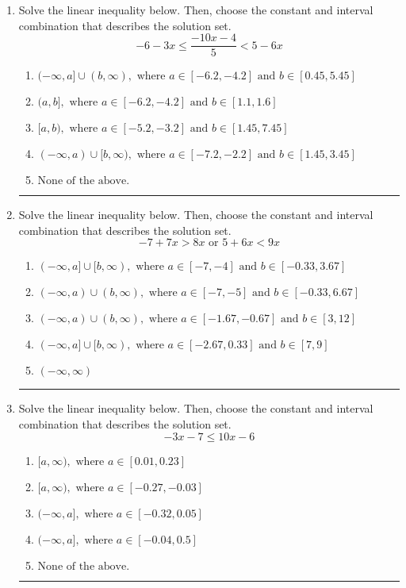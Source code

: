 \documentclass[14pt]{extbook}
\newcommand{\litem}[1]{\item#1\hspace*{-1cm}\rule{\textwidth}{0.4pt}}
\begin{document}
\begin{enumerate}
{\begin{enumerate}[label=\Alph*.]
\end{enumerate} }
\litem{
Solve the linear inequality below. Then, choose the constant and interval combination that describes the solution set.\[ -6 - 3 x \leq \frac{-10 x - 4}{5} < 5 - 6 x \]\begin{enumerate}[label=\Alph*.]
\item \( (-\infty, a] \cup (b, \infty), \text{ where } a \in [-6.2, -4.2] \text{ and } b \in [0.45, 5.45] \)
\item \( (a, b], \text{ where } a \in [-6.2, -4.2] \text{ and } b \in [1.1, 1.6] \)
\item \( [a, b), \text{ where } a \in [-5.2, -3.2] \text{ and } b \in [1.45, 7.45] \)
\item \( (-\infty, a) \cup [b, \infty), \text{ where } a \in [-7.2, -2.2] \text{ and } b \in [1.45, 3.45] \)
\item \( \text{None of the above.} \)

\end{enumerate} }
\litem{
Solve the linear inequality below. Then, choose the constant and interval combination that describes the solution set.\[ -7 + 7 x > 8 x \text{ or } 5 + 6 x < 9 x \]\begin{enumerate}[label=\Alph*.]
\item \( (-\infty, a] \cup [b, \infty), \text{ where } a \in [-7, -4] \text{ and } b \in [-0.33, 3.67] \)
\item \( (-\infty, a) \cup (b, \infty), \text{ where } a \in [-7, -5] \text{ and } b \in [-0.33, 6.67] \)
\item \( (-\infty, a) \cup (b, \infty), \text{ where } a \in [-1.67, -0.67] \text{ and } b \in [3, 12] \)
\item \( (-\infty, a] \cup [b, \infty), \text{ where } a \in [-2.67, 0.33] \text{ and } b \in [7, 9] \)
\item \( (-\infty, \infty) \)

\end{enumerate} }
\litem{
Solve the linear inequality below. Then, choose the constant and interval combination that describes the solution set.\[ -3x -7 \leq 10x -6 \]\begin{enumerate}[label=\Alph*.]
\item \( [a, \infty), \text{ where } a \in [0.01, 0.23] \)
\item \( [a, \infty), \text{ where } a \in [-0.27, -0.03] \)
\item \( (-\infty, a], \text{ where } a \in [-0.32, 0.05] \)
\item \( (-\infty, a], \text{ where } a \in [-0.04, 0.5] \)
\item \( \text{None of the above}. \)

\end{enumerate} }
\end{enumerate}
\end{document}
